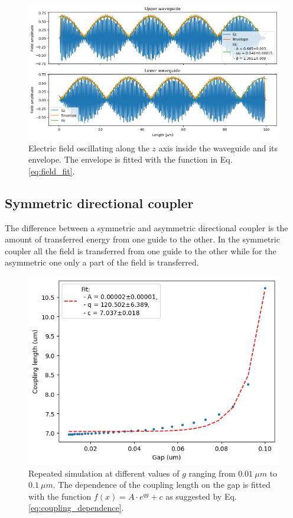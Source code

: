 \begin{figure}[H]
    \centering
    \includegraphics[width=0.6\linewidth]{Figures/wg_field_fit.png}
    \caption{Electric field oscillating along the $z$ axis inside the waveguide and its envelope. The envelope is fitted with the function in Eq. \ref{eq:field_fit}.}
    \label{fig:wg_field_fit}
\end{figure}

\subsection{Symmetric directional coupler}

The difference between a symmetric and asymmetric directional coupler is the amount of transferred energy from one guide to the other. In the symmetric coupler all the field is transferred from one guide to the other while for the asymmetric one only a part of the field is transferred. 

\begin{figure}[H]
        \centering
        \includegraphics[width=0.5\linewidth]{Figures/wg_coupling_vs_gap.png}
        \caption{Repeated simulation at different values of \(g\) ranging from \(0.01\ \mu m\) to \(0.1\ \mu m\). The dependence of the coupling length on the gap is fitted with the function \(f(x) = A \cdot e^{qg} + c\) as suggested by Eq. \ref{eq:coupling_dependence}.}
        \label{fig:wg_coupling_vs_gap}
\end{figure}
        
